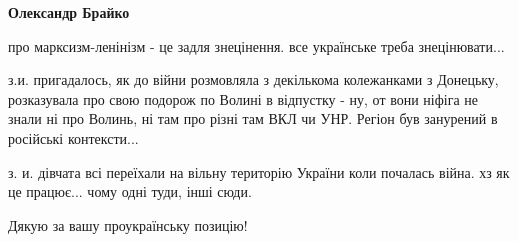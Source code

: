 \begin{itemize}
\begin{itemize}
 
\textbf{Олександр Брайко} 

про марксизм-ленінізм - це задля знецінення. все українське треба
знецінювати...

з.и. пригадалось, як до війни розмовляла з декількома колежанками з Донецьку,
розказувала про свою подорож по Волині в відпустку - ну, от вони ніфіга не
знали ні про Волинь, ні там про різні там ВКЛ чи УНР. Регіон був занурений в
російські контексти...

з. и. дівчата всі переїхали на вільну територію України коли почалась війна. хз
як це працює... чому одні туди, інші сюди.

\end{itemize}

 
Дякую за вашу проукраїнську позицію!🙏💙💛

\end{itemize}

